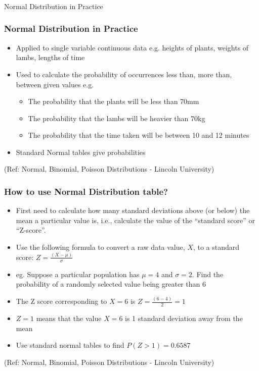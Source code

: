 \begin{frame}[fragile]\frametitle{}
\begin{center}
{\Large Normal Distribution in Practice}
\end{center}
\end{frame}


\begin{frame}
\frametitle{Normal Distribution in Practice}

\begin{itemize}
\item Applied to single variable continuous data e.g. heights of plants, weights of lambs, lengths of time
\item Used to calculate the probability of occurrences less than, more than, between given values e.g. 
\begin{itemize}
\item The probability that the plants will be less than 70mm
\item The probability that the lambs will be heavier than 70kg
\item The probability that the time taken will be between 10 and 12 minutes
\end{itemize}
\item Standard Normal tables give probabilities
\end{itemize}


{\tiny (Ref: Normal, Binomial, Poisson Distributions -  Lincoln University)}
\end{frame}

\begin{frame}
\frametitle{How to use Normal Distribution table?}

\begin{itemize}
\item First need to calculate how many standard deviations above (or below) the mean a
particular value is, i.e., calculate the value of the ``standard score'' or ``Z-score''.
\item Use the following formula to convert a raw data value, $X$, to a standard score:
$Z = \frac{(X - \mu)}{\sigma}$
\item eg. Suppose a particular population has $\mu= 4$ and $\sigma = 2$. Find the probability of a
randomly selected value being greater than 6
\item The Z score corresponding to $X = 6$ is $Z = \frac{(6 - 4)}{2} = 1$
\item $Z=1$ means that the value $X = 6$ is 1 standard deviation away from the mean
\item Use  standard normal tables to find $P(Z>1) = 0.6587$
\end{itemize}


{\tiny (Ref: Normal, Binomial, Poisson Distributions -  Lincoln University)}
\end{frame}

